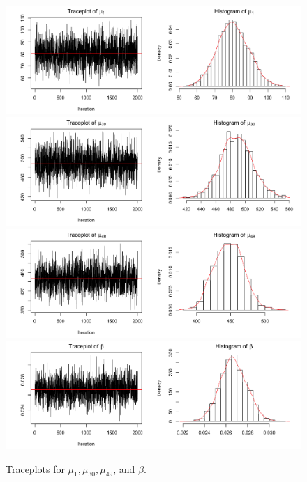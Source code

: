 \documentclass{asaproc}
\begin{document}
\clearpage
\begin{figure}[th!]
    \centering
    \includegraphics[scale = 0.4]{m1_mu1.png}\\
    \includegraphics[scale = 0.4]{m1_mu30.png}\\
    \includegraphics[scale = 0.4]{m1_mu49.png}\\
    \includegraphics[scale = 0.4]{m1_betas.png}
    \caption{Traceplots for $\mu_{1},\mu_{30},\mu_{49}$, and $\beta$.}
    \label{m1_TraceHists}
\end{figure}
\end{document}

